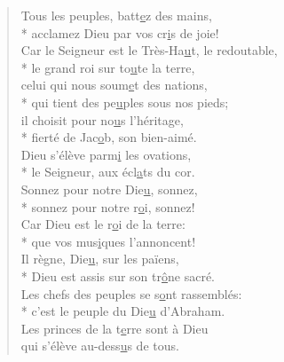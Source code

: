 
\begin{verse}
Tous les peuples, batt\underline{e}z des mains, \\*
acclamez Dieu par vos cr\underline{i}s de joie! \\

Car le Seigneur est le Très-Ha\underline{u}t, le redoutable, \\*
le grand roi sur to\underline{u}te la terre, \\
celui qui nous soum\underline{e}t des nations, \\*
qui tient des pe\underline{u}ples sous nos pieds; \\
il choisit pour no\underline{u}s l’héritage, \\*
fierté de Jac\underline{o}b, son bien-aimé. \\

Dieu s’élève parm\underline{i} les ovations, \\*
le Seigneur, aux écl\underline{a}ts du cor. \\
Sonnez pour notre Die\underline{u}, sonnez, \\*
sonnez pour notre r\underline{o}i, sonnez! \\
Car Dieu est le r\underline{o}i de la terre: \\*
que vos mus\underline{i}ques l’annoncent! \\

Il règne, Die\underline{u}, sur les païens, \\*
Dieu est assis sur son tr\underline{ô}ne sacré. \\
Les chefs des peuples se s\underline{o}nt rassemblés: \\*
c’est le peuple du Die\underline{u} d’Abraham. \\
Les princes de la t\underline{e}rre sont à Dieu \\
qui s’élève au-dess\underline{u}s de tous. \\
\end{verse}


